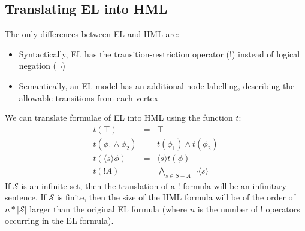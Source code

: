 \documentclass[smallextended]{svjour3}       %
\numberwithin{subcase}{mycase}
\begin{document}
\subsection{Translating EL into HML}
The only differences between EL and HML are:
\begin{itemize}
\item
Syntactically, EL has the transition-restriction operator ($!$) instead of logical negation ($\neg$)
\item
Semantically, an EL model has an additional node-labelling, describing the allowable transitions from each vertex
\end{itemize}
We can translate formulae of EL into HML using the function $t$:
\begin{eqnarray}
t(\top) & = & \top \nonumber \\
t(\phi_1 \land \phi_2) & = & t(\phi_1) \land t(\phi_2) \nonumber \\
t(\langle s \rangle \phi) & = & \langle s \rangle t(\phi) \nonumber \\
t(! A) & = & \bigwedge_{s \in S - A} \neg \langle s \rangle \top \nonumber
\end{eqnarray}
If $\mathcal{S}$ is an infinite set, then the translation of a $!$ formula will be an infinitary sentence.
If $\mathcal{S}$ is finite, then the size of the HML formula will be of the order of $n * |\mathcal{S}|$ larger than the original EL formula (where $n$ is the number of $!$ operators occurring in the EL formula).
\end{document}
